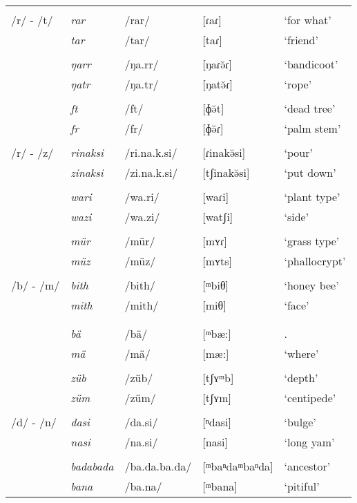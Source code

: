 \begin{longtable}{lllll}
		&&&&\\
		/r/ - /t/ & \emph{rar} & /rar/ & [ɾaɾ] & `for what'\\
		& \emph{tar} & /tar/ & [taɾ] & `friend'\\
		&&&&\\
		& \emph{ŋarr} & /ŋa.rr/ & [ŋaɾə̆ɾ] & `bandicoot'\\
		& \emph{ŋatr} & /ŋa.tr/ & [ŋatə̆ɾ] & `rope'\\
		&&&&\\
		& \emph{ft} & /ft/ & [ɸə̆t] & `dead tree'\\
		& \emph{fr} & /fr/ & [ɸə̆ɾ] & `palm stem'\\
		&&&&\\
		/r/ - /z/ & \emph{rinaksi} & /ri.na.k.si/ & [ɾinakə̆si] & `pour'\\
		& \emph{zinaksi} & /zi.na.k.si/ & [tʃinakə̆si] & `put down'\\
		&&&&\\
		& \emph{wari} & /wa.ri/ & [waɾi] & `plant type'\\
		& \emph{wazi} & /wa.zi/ & [watʃi] & `side'\\
		&&&&\\
		& \emph{mür} & /mür/ & [mʏɾ] & `grass type'\\
		& \emph{müz} & /müz/ & [mʏts] & `phallocrypt'\\
		&&&&\\
		/b/ - /m/ & \emph{bith} & /bith/ & [ᵐbiθ] & `honey bee'\\
		& \emph{mith} &	/mith/ & [miθ] & `face'\\
		&&&&\\
		&&&&\\
		& \emph{bä} & /bä/	& [ᵐbæ:] & \Second.\Abs{} \\
		& \emph{mä}	& /mä/	& [mæ:] & `where' \\
		&&&&\\
		& \emph{züb} & /züb/ & [tʃʏᵐb] & `depth'\\
		& \emph{züm} & /züm/ & [tʃʏm] & `centipede'\\
		&&&&\\
		/d/ - /n/ & \emph{dasi} & /da.si/ & [ⁿdasi] & `bulge'\\
		& \emph{nasi} & /na.si/	& [nasi] & `long yam'\\
		&&&&\\
		& \emph{badabada} & /ba.da.ba.da/ & [ᵐbaⁿdaᵐbaⁿda]& `ancestor'\\
		& \emph{bana} & /ba.na/ & [ᵐbana]& `pitiful'\\

\end{longtable}
